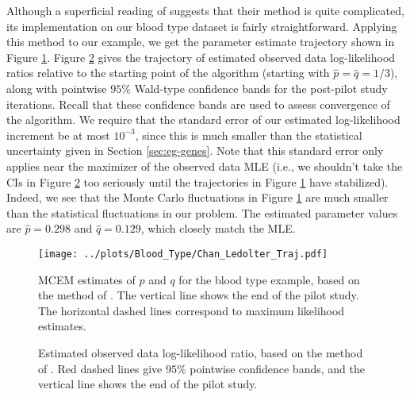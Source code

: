 \documentclass[11pt, oneside]{article}   	%
\begin{document}
Although a superficial reading of \citeauthor{Cha95} suggests that their method is quite complicated, its implementation on our blood type dataset is fairly straightforward. Applying this method to our example, we get the parameter estimate trajectory shown in Figure \ref{fig:blood_CL_MCEM_estimates}. Figure \ref{fig:blood_CL_MCEM_likelihoods} gives the trajectory of estimated observed data log-likelihood ratios relative to the starting point of the algorithm (starting with $\hat{p} = \hat{q} = 1/3$), along with pointwise $95\%$ Wald-type confidence bands for the post-pilot study iterations. Recall that these confidence bands are used to assess convergence of the algorithm. We require that the standard error of our estimated log-likelihood increment be at most $10^{-3}$, since this is much smaller than the statistical uncertainty given in Section \ref{sec:eg-genes}. Note that this standard error only applies near the maximizer of the observed data MLE (i.e., we shouldn't take the CIs in Figure \ref{fig:blood_CL_MCEM_likelihoods} too seriously until the trajectories in Figure \ref{fig:blood_CL_MCEM_estimates} have stabilized). Indeed, we see that the Monte Carlo fluctuations in Figure \ref{fig:blood_CL_MCEM_estimates} are much smaller than the statistical fluctuations in our problem. The estimated parameter values are $\hat{p} = 0.298$ and $\hat{q} = 0.129$, which closely match the MLE.

\begin{figure}
    \centering
    \caption{MCEM estimates of $p$ and $q$ for the blood type example, based on the method of \citet{Cha95}. The vertical line shows the end of the pilot study. The horizontal dashed lines correspond to maximum likelihood estimates.}
    \texttt{[image: ../plots/Blood\_Type/Chan\_Ledolter\_Traj.pdf]} 
    \label{fig:blood_CL_MCEM_estimates}
\end{figure}

\begin{figure}
    \centering
    \caption{Estimated observed data log-likelihood ratio, based on the method of \citet{Cha95}. Red dashed lines give $95\%$ pointwise confidence bands, and the vertical line shows the end of the pilot study.}

    
    \label{fig:blood_CL_MCEM_likelihoods}
\end{figure}
\end{document}
